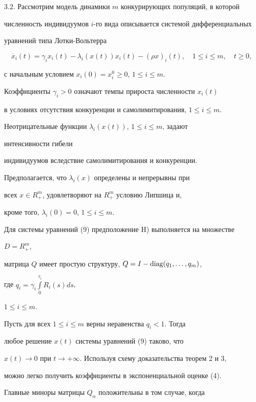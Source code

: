 3.2. Рассмотрим модель динамики $m$ конкурирующих популяций, в которой


численность индивидуумов $i$-го вида описывается системой дифференциальных


уравнений типа Лотки-Вольтерра


\begin{equation}


\Dot{x_i}(t) = \gamma_i x_i(t) -


\lambda_i (x(t)) x_i(t) - (\rho x)_i(t),


\quad 1 \le i \le m, \quad t \ge 0,


\end{equation}


с начальным условием $x_i(0) = x_i^0 \ge 0$, $1 \le i \le m$.


Коэффициенты $\gamma_i > 0$ означают темпы прироста численности $x_i(t)$


в условиях отсутствия конкуренции и самолимитирования, $1 \le i \le m$.


Неотрицательные функции $\lambda_i (x(t))$, $1 \le i \le m$, задают 


интенсивности гибели


индивидуумов вследствие самолимитирования и конкуренции.


Предполагается, что $\lambda_i (x)$ определены и непрерывны при


всех $x \in R^m_+$, удовлетворяют на $R^m_+$ условию Липшица и,


кроме того, $\lambda_i (0) = 0$, $1 \le i \le m$.


Для системы уравнений (9) предположение H) выполняется на множестве


$D=R^m_+$,


матрица $Q$ имеет простую структуру, $Q=I-\operatorname{diag}(q_1,\dotsc,q_m)$,


где $q_i = \gamma_i \int\limits_0^{\tau_i} R_i (s)ds$,


$1 \le i \le m$.


Пусть для всех $1 \le i \le m$ верны неравенства $q_i < 1$. Тогда


любое решение $x(t)$ системы уравнений (9) таково, что


$x(t) \to 0$ при $t \to +\infty$. Используя схему доказательства теорем 2 и 3,


можно легко получить коэффициенты в экспоненциальной оценке (4).


Главные миноры матрицы $Q_\alpha$ положительны в том случае, когда


